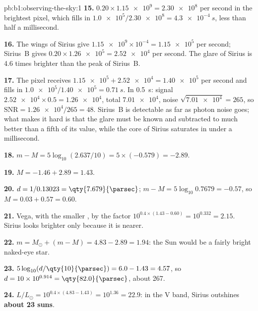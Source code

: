 \begin{solution}{pb:b1:observing-the-sky:1}
\textbf{15.} $0.20\times\num{1.15e9} = \num{2.30e8}$ per second in the
brightest pixel, which fills in $\num{1.0e5}/\num{2.30e8} =
\qty{4.3e-4}{s}$, less than half a millisecond.

\textbf{16.} The wings of Sirius give $\num{1.15e9}\times10^{-4} =
\num{1.15e5}$ per second; Sirius~B gives $0.20\times\num{1.26e5} =
\num{2.52e4}$ per second. The glare of Sirius is 4.6 times brighter than the
peak of Sirius~B.

\textbf{17.} The pixel receives $\num{1.15e5} + \num{2.52e4} = \num{1.40e5}$
per second and fills in $\num{1.0e5}/\num{1.40e5} = \qty{0.71}{s}$. In
\qty{0.5}{s}: signal $\num{2.52e4}\times0.5 = \num{1.26e4}$, total
$\num{7.01e4}$, noise $\sqrt{\num{7.01e4}} = 265$, so $\mathrm{SNR} =
\num{1.26e4}/265 = 48$. Sirius~B is detectable as far as photon noise goes;
what makes it hard is that the glare must be known and subtracted to much
better than a fifth of its value, while the core of Sirius saturates in
under a millisecond.

\textbf{18.} $m - M = 5\log_{10}(2.637/10) = 5\times(-0.579) = -2.89$.

\textbf{19.} $M = -1.46 + 2.89 = 1.43$.

\textbf{20.} $d = 1/0.13023 = \qty{7.679}{\parsec}$;
$m - M = 5\log_{10}0.7679 = -0.57$, so $M = 0.03 + 0.57 = 0.60$.

\textbf{21.} Vega, with the smaller , by the factor
$10^{0.4\times(1.43 - 0.60)} = 10^{0.332} = 2.15$. Sirius looks brighter
only because it is nearer.

\textbf{22.} $m = M_\odot + (m - M) = 4.83 - 2.89 = 1.94$: the Sun would be
a fairly bright naked-eye star.

\textbf{23.} $5\log_{10}(d/\qty{10}{\parsec}) = 6.0 - 1.43 = 4.57$, so
$d = 10\times10^{0.914} = \qty{82.0}{\parsec}$, about \qty{267}{\lightyear}.

\textbf{24.} $L/L_\odot = 10^{0.4\times(4.83 - 1.43)} = 10^{1.36} = 22.9$:
in the V band, Sirius outshines \textbf{about 23 suns}.
\end{solution}

